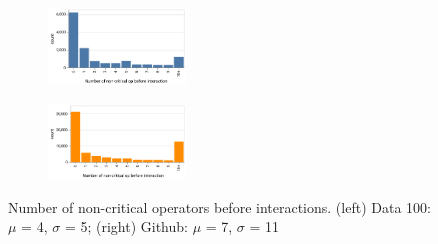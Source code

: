 \begin{figure}[h!]
     \centering
    \begin{subfigure}%
         \centering
         \includegraphics[width=0.4\textwidth]{submissions/interactivity/figures/ds_nooo_v2.pdf}
     \end{subfigure}
     \hfill
     \begin{subfigure}%
         \centering
         \includegraphics[width=0.4\textwidth]{submissions/interactivity/figures/gb_nooo_v2.pdf}
     \end{subfigure}
     \caption{Number of non-critical operators before interactions. (left) Data 100: $\mu$ = 4, $\sigma$ = 5; (right) Github: $\mu$ = 7, $\sigma$ = 11}
    \label{fig:nooo}
\end{figure}

